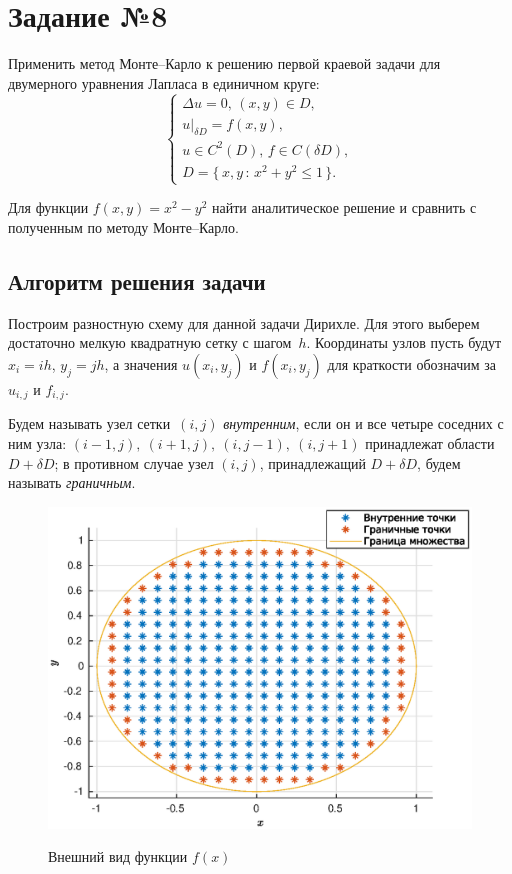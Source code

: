\section{Задание №8}

Применить метод Монте--Карло к решению первой краевой задачи для двумерного уравнения Лапласа в единичном круге:
$$
        \left\{
\begin{array}{lcr}
        \Delta u=0, \, (x,y)\in D,
\\
        u|_{\delta D}=f(x,y),
\\
        u\in C^2(D), \, f \in C(\delta D),
\\
        D = \{\, x,y \,:\, x^2+y^2 \leqslant 1 \,\}.
\end{array}
        \right.
$$

Для функции $f(x,y)=x^2-y^2$ найти аналитическое решение и сравнить с полученным по методу Монте--Карло.

\subsection{Алгоритм решения задачи}

Построим разностную схему для данной задачи Дирихле. Для этого выберем достаточно мелкую квадратную сетку с шагом~$h$. Координаты узлов пусть будут $x_i = ih$, $y_j = jh$, а значения $u(x_i, y_j)$ и $f(x_i,y_j)$ для краткости обозначим за $u_{i,j}$ и $f_{i,j}$.

\begin{definition}
        Будем называть узел сетки~$(i, j)$ \textit{внутренним}, если он и все четыре соседних с ним узла: $(i-1, j), \ (i + 1, j), \ (i, j - 1), \ (i, j + 1)$ принадлежат области~$D + \delta D$; в противном случае узел $(i, j)$, принадлежащий $D + \delta D$, будем называть \textit{граничным}.
\end{definition}

\begin{figure}[h]
        \noindent
        \centering
        {
                \includegraphics[width=120mm]{task_08/circle.eps}
        }
        \caption{Внешний вид функции $f(x)$}
\end{figure}